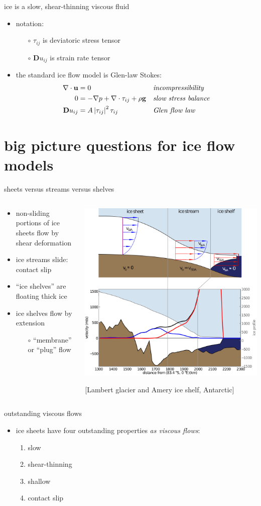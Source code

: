 \documentclass[hide notes,intlimits]{beamer}
\newcommand{\contactslipslide}{
\begin{frame}{sheets versus streams versus shelves}

\begin{columns}
\begin{column}{0.35\textwidth}
\small
\begin{itemize}
\small
\item non-sliding portions of ice sheets flow by shear deformation
\item ice streams slide: \alert{contact slip}
\item ``ice shelves'' are floating thick ice
\item ice shelves flow by extension
  \begin{itemize}
  \scriptsize
  \item[$\circ$] ``membrane'' or ``plug'' flow
  \end{itemize}
\end{itemize}
\end{column}

\begin{column}{0.65\textwidth}
\includegraphics[width=1.1\textwidth]{siassacartoon-lambert}

\begin{center}
\vspace{-0.18in}
\tiny [Lambert glacier and Amery ice shelf, Antarctic]
\end{center}
\end{column}
\end{columns}
\end{frame}
}
\begin{document}
\begin{frame}{ice is a slow, shear-thinning viscous fluid}

\begin{itemize}
\item notation:
  \begin{itemize}
  \item[$\circ$] $\tau_{ij}$ is deviatoric stress tensor
  \item[$\circ$] $\mathbf{D}u_{ij}$ is strain rate tensor
  \end{itemize}
\smallskip
\item the standard ice flow model is Glen-law Stokes:
\begin{align*}
\nabla \cdot \mathbf{u} &= 0 &&\text{\emph{incompressibility}} \\
0 &= - \nabla p + \nabla \cdot \tau_{ij} + \rho \mathbf{g} &&\text{\emph{slow stress balance}} \\
\mathbf{D}u_{ij} &= A \left|\tau_{ij}\right|^2 \tau_{ij} &&\text{\emph{Glen flow law}}
\end{align*}
\end{itemize}
\end{frame}


\section[big questions]{big picture questions for ice flow models}


\contactslipslide


\begin{frame}{outstanding viscous flows}

\begin{itemize}
\item ice sheets have four outstanding properties \emph{as viscous flows}:
  \begin{enumerate}
  \item \alert{slow}
  \item \alert{shear-thinning}
  \item \alert{shallow}
  \item \alert{contact slip}
  \end{enumerate}
\end{itemize}
\end{frame}
\end{document}
